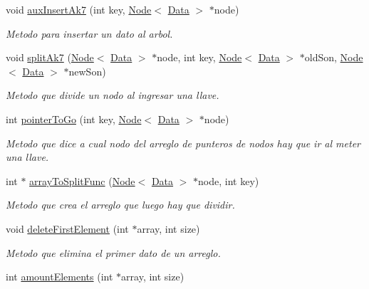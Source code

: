 \begin{DoxyCompactItemize}
void \hyperlink{classBPlusTree_ad2fc2c2dfe80e853f51827095d88808a}{aux\+Insert\+Ak7} (int key, \hyperlink{classNode}{Node}$<$ \hyperlink{main_8cpp_a0c209e815d35b218025a240523b4335b}{Data} $>$ $\ast$node)
\begin{DoxyCompactList}\small\item\em Metodo para insertar un dato al arbol. \end{DoxyCompactList}\item 
void \hyperlink{classBPlusTree_afa91ee0ef70f54bcfe087a9c894edcd2}{split\+Ak7} (\hyperlink{classNode}{Node}$<$ \hyperlink{main_8cpp_a0c209e815d35b218025a240523b4335b}{Data} $>$ $\ast$node, int key, \hyperlink{classNode}{Node}$<$ \hyperlink{main_8cpp_a0c209e815d35b218025a240523b4335b}{Data} $>$ $\ast$old\+Son, \hyperlink{classNode}{Node}$<$ \hyperlink{main_8cpp_a0c209e815d35b218025a240523b4335b}{Data} $>$ $\ast$new\+Son)
\begin{DoxyCompactList}\small\item\em Metodo que divide un nodo al ingresar una llave. \end{DoxyCompactList}\item 
int \hyperlink{classBPlusTree_a78301c77d2aee16039680ba1e65718af}{pointer\+To\+Go} (int key, \hyperlink{classNode}{Node}$<$ \hyperlink{main_8cpp_a0c209e815d35b218025a240523b4335b}{Data} $>$ $\ast$node)
\begin{DoxyCompactList}\small\item\em Metodo que dice a cual nodo del arreglo de punteros de nodos hay que ir al meter una llave. \end{DoxyCompactList}\item 
int $\ast$ \hyperlink{classBPlusTree_a390038248adfe3d85ab2c25015ce07e3}{array\+To\+Split\+Func} (\hyperlink{classNode}{Node}$<$ \hyperlink{main_8cpp_a0c209e815d35b218025a240523b4335b}{Data} $>$ $\ast$node, int key)
\begin{DoxyCompactList}\small\item\em Metodo que crea el arreglo que luego hay que dividir. \end{DoxyCompactList}\item 
void \hyperlink{classBPlusTree_aca5abac752f2e91b8d9642d145dc8c74}{delete\+First\+Element} (int $\ast$array, int size)
\begin{DoxyCompactList}\small\item\em Metodo que elimina el primer dato de un arreglo. \end{DoxyCompactList}\item 
int \hyperlink{classBPlusTree_af72ca8a996a12aaf3875717b35ddba4d}{amount\+Elements} (int $\ast$array, int size)

\end{DoxyCompactItemize}
